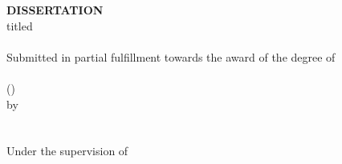 
\thispagestyle{empty}
\begin{center}
    \large {\textbf{\MakeUppercase{Dissertation}}}
    \\\vspace{10pt}
    \normalsize titled
    \\\vspace{10pt}
\Large
\textbf{\MakeUppercase{\Title{}}}
    \\\vspace{20pt}
    \normalsize Submitted in partial fulfillment towards the award of the degree of \\\vspace{17pt}
    \resizebox{0.7\linewidth}{!}{{{ {\CloisterBlack{}\Degree{}}}}}\\\vspace{10pt}
    \large(\MakeUppercase{\Subject{}})\\\vspace{10pt}
    \normalsize by
    \\\vspace{10pt}
    \large \textbf{\MakeUppercase{\Atitle{} \Author{}}\\ \MakeUppercase{\Rollno{}}}
\\\vspace{17pt}
    \normalsize Under the supervision of
\\\vspace{17pt}
\ifdef{\ExternalSupervisor}{
\large \textbf{\MakeUppercase{\ExternalSupervisor{}\\\ExternalSupervisorInsti{}, \ExternalSupervisorInstiCity{}\vspace{10pt}\\ {\InternalSupervisor{}\\ \InstituteNameShort{}, \InstituteCity{}} }}}{\large \textbf{\MakeUppercase{{\InternalSupervisor{}\\ \InternalSupervisorPosition{}\\
}}}}
\end{center}

